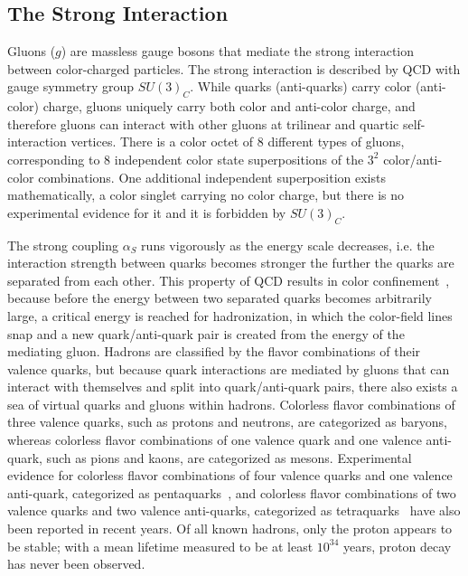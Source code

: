 \subsection{The Strong Interaction}
Gluons ($g$) are massless gauge bosons that mediate the strong interaction between color-charged particles.
The strong interaction is described by QCD with gauge symmetry group $SU(3)_C$.
While quarks (anti-quarks) carry color (anti-color) charge, gluons uniquely carry both color and anti-color charge, and therefore gluons can interact with other gluons at trilinear and quartic self-interaction vertices.
There is a color octet of 8 different types of gluons, corresponding to 8 independent color state superpositions of the $3^2$ color/anti-color combinations.
One additional independent superposition exists mathematically, a color singlet carrying no color charge, but there is no experimental evidence for it and it is forbidden by $SU(3)_C$.

The strong coupling $\alpha_S$ runs vigorously as the energy scale decreases, i.e. the interaction strength between quarks becomes stronger the further the quarks are separated from each other.
This property of QCD results in color confinement~\cite{FRITZSCH1973365}, because before the energy between two separated quarks becomes arbitrarily large, a critical energy is reached for hadronization, in which the color-field lines snap and a new quark/anti-quark pair is created from the energy of the mediating gluon.
Hadrons are classified by the flavor combinations of their valence quarks, but because quark interactions are mediated by gluons that can interact with themselves and split into quark/anti-quark pairs, there also exists a sea of virtual quarks and gluons within hadrons.
Colorless flavor combinations of three valence quarks, such as protons and neutrons, are categorized as baryons, whereas colorless flavor combinations of one valence quark and one valence anti-quark, such as pions and kaons, are categorized as mesons.
Experimental evidence for colorless flavor combinations of four valence quarks and one valence anti-quark, categorized as pentaquarks~\cite{PhysRevLett.115.072001}, and colorless flavor combinations of two valence quarks and two valence anti-quarks, categorized as tetraquarks~\cite{PhysRevLett.110.252002} have also been reported in recent years.
Of all known hadrons, only the proton appears to be stable; with a mean lifetime measured to be at least $10^{34}$ years, proton decay has never been observed.

